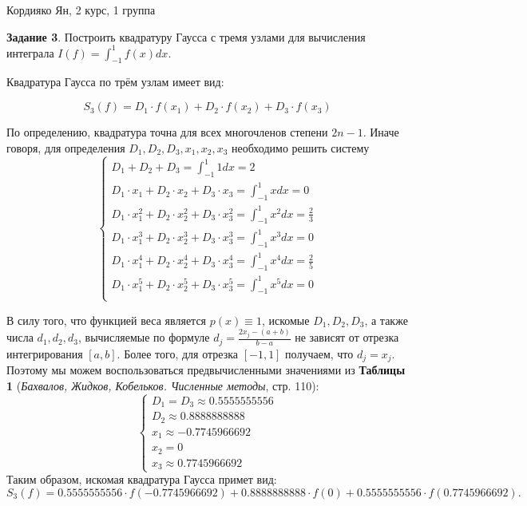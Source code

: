 \documentclass[fleqn]{article}
\begin{document}
Кордияко Ян, 2 курс, 1 группа

\textbf {Задание 3}. Построить квадратуру Гаусса с тремя узлами для вычисления интеграла
$I(f) = \int_{-1}^1 f(x) dx$.

Квадратура Гаусса по трём узлам имеет вид:

\begin{equation*}
	S_3(f) = D_1\cdot{}f(x_1) + D_2\cdot{}f(x_2) + D_3\cdot{}f(x_3)
\end{equation*}

По определению, квадратура точна для всех многочленов степени $2n - 1$. Иначе
говоря, для определения $D_1, D_2, D_3, x_1, x_2, x_3$ необходимо решить систему
\begin{equation*}
	\begin{cases}
	D_1 + D_2 + D_3 =   \int_{-1}^1 1 dx= 2\\
	D_1\cdot{}x_1 + D_2\cdot{}x_2 + D_3\cdot{}x_3 =   \int_{-1}^1 x dx = 0\\
	D_1\cdot{}x_1^2 + D_2\cdot{}x_2^2 + D_3\cdot{}x_3^2 =   \int_{-1}^1 x^2 dx = \frac23\\
	D_1\cdot{}x_1^3 + D_2\cdot{}x_2^3 + D_3\cdot{}x_3^3 =   \int_{-1}^1 x^3  dx = 0\\
	D_1\cdot{}x_1^4 + D_2\cdot{}x_2^4 + D_3\cdot{}x_3^4 =   \int_{-1}^1 x^4 dx = \frac25\\
	D_1\cdot{}x_1^5 + D_2\cdot{}x_2^5 + D_3\cdot{}x_3^5 =   \int_{-1}^1 x^5 dx = 0\\
	\end{cases}
\end{equation*}

В силу того, что функцией веса является $p(x) \equiv 1$,  искомые $D_1, D_2, D_3$, а
также числа $d_1, d_2, d_3$, вычисляемые по формуле $d_j = \frac{2x_j - (a+b)}{b - a}$
не зависят от отрезка интегрирования $[a, b]$. Более того, для отрезка
$[-1, 1]$ получаем, что $d_j = x_j$. Поэтому мы можем воспользоваться 
предвычисленными значениями из \textbf {Таблицы 1} 
(\emph{Бахвалов, Жидков, Кобельков. Численные методы}, стр. 110):
\begin{equation*}
	\begin{cases}
	D_1  = D_3 \approx 0.5555555556 \\
	D_2 \approx 0.8888888888 \\
	x_1 \approx - 0.7745966692 \\
	x_2 = 0 \\
	x_3 \approx  0.7745966692
	\end{cases}
\end{equation*}
Таким образом, искомая квадратура Гаусса примет вид: 
\begin{equation*}
	S_3(f) = 0.5555555556\cdot{}f(- 0.7745966692) +
	0.8888888888\cdot{}f(0) + 
	0.5555555556\cdot{}f(0.7745966692).
\end{equation*}
\end{document}
